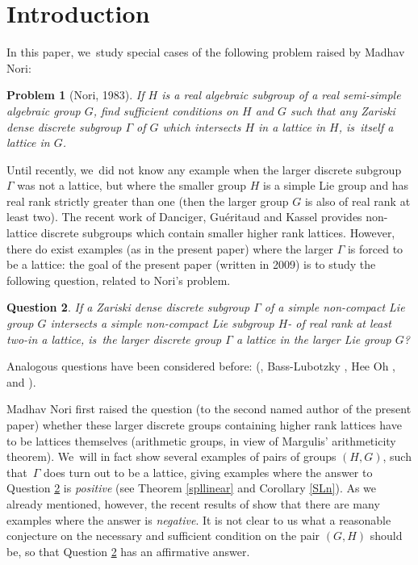 \documentclass[JEP,XML,SOM,Unicode,published]{cedram}
\newtheorem{problem}{Problem}
\newtheorem{question}[problem]{Question}
\theoremstyle{definition}
\let\G\Gamma
\begin{document}
\tableofcontents
\mainmatter

\section{Introduction}
In this paper, we~study special cases of the following problem raised by Madhav Nori:

\begin{problem}[Nori, 1983] If $H$ is a real algebraic subgroup of a real semi-simple algebraic
group $G$, find sufficient conditions on $H$ and $G$ such that any Zariski dense discrete
subgroup $\Gamma $ of $G$ which intersects $H$ in a lattice in $H$, is~itself a lattice in $G$.
\end{problem}

Until recently, we~did not know any example when the larger discrete subgroup~$\G$ was not a lattice, but where the smaller group $H$ is a simple Lie group and has real rank strictly greater than one (then the
larger group $G$ is also of real rank at least two). The recent work of Danciger, Guéritaud and Kassel \cite{DGK} provides non-lattice discrete subgroups which contain smaller higher rank lattices. However, there do exist examples (as in the present paper) where the larger $\G$ is forced to be a lattice: the goal of the present paper (written in 2009) is to study the following question, related to Nori's problem.

\begin{question}\label{nori} If a Zariski dense discrete subgroup $\Gamma$ of
a simple non-compact Lie group $G$ intersects a simple non-compact Lie
subgroup $H$- of real rank at least two-in a lattice, is~the larger discrete group $\Gamma$ a
lattice in the larger Lie group $G$?
\end{question}

Analogous questions have been considered before: (\eg \cite{F-K}, Bass-Lubotzky \cite{B-L}, Hee Oh \cite{O}, and \cite{V2}).

Madhav Nori first raised the question (to the second named author of the present paper) whether these larger discrete groups containing higher rank lattices have to be lattices themselves (\ie arithmetic groups, in view of Margulis' arithmeticity theorem). We~will in fact show several examples of pairs of groups $(H,G)$, such
that~$\Gamma $ does turn out to be a lattice, giving examples where the answer to Question \ref{nori} is \emph{positive} (see Theorem \ref{spllinear} and Corollary \ref{SLn}). As we already mentioned, however, the recent results of \cite{DGK} show that there are many examples where the answer is \emph{negative}. It is not clear to us what a reasonable conjecture on the necessary and sufficient condition on the pair $(G,H)$ should be, so that Question \ref{nori} has an affirmative answer.
\end{document}
